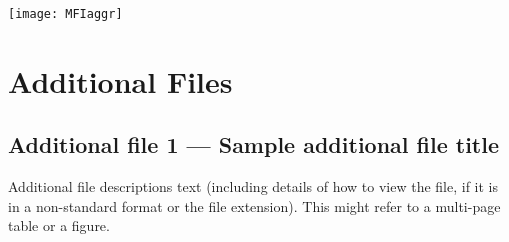 \documentclass[twocolumn]{bmcart}%
\begin{document}
\begin{backmatter}



      
\begin{figure*}[h]
  \texttt{[image: MFIaggr]}
  \caption{\label{figure:MFIaggr}
   The cycles 1 -- 10 were selected as region of interest (ROI). The 
function 
\textsl{MFIaggr} was used to analyze the variance of a 96-well plate cycler 
(Bio-Rad CFX96) and EvaGreen\textregistered for detection (left panel). The 
mean 
and the median 
were almost identical. The density plot (right upper panel) and 
quantile-quantile analysis (right lower panel). Both analytical plots indicate 
that the data of the background range are normal distributed. Note that both 
the 
$median \pm mad$ and the $mean \pm sd$ have similar results. }
      \end{figure*}       
  
     




\section*{Additional Files}
  \subsection*{Additional file 1 --- Sample additional file title}
    Additional file descriptions text (including details of how to
    view the file, if it is in a non-standard format or the file extension).  This might
    refer to a multi-page table or a figure.



\end{backmatter}
\end{document}
